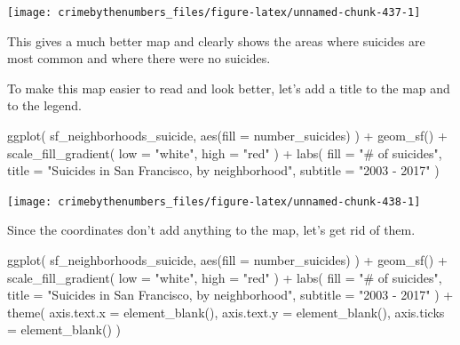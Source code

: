 \documentclass[
]{krantz}
\makeatletter
\newenvironment{Shaded}{\begin{snugshade}}{\end{snugshade}}
\newcommand{\AttributeTok}[1]{\textcolor[rgb]{0.61,0.61,0.61}{#1}}
\newcommand{\FunctionTok}[1]{\textcolor[rgb]{0,0,0}{#1}}
\newcommand{\NormalTok}[1]{#1}
\newcommand{\SpecialCharTok}[1]{\textcolor[rgb]{0,0,0}{#1}}
\newcommand{\StringTok}[1]{\textcolor[rgb]{0.5,0.5,0.5}{#1}}
\newenvironment{kframe}{%
\medskip{}
\setlength{\fboxsep}{.8em}
 \def\at@end@of@kframe{}%
 \ifinner\ifhmode%
  \def\at@end@of@kframe{\end{minipage}}%
  \begin{minipage}{\columnwidth}%
 \fi\fi%
 \def\FrameCommand##1{\hskip\@totalleftmargin \hskip-\fboxsep
 \colorbox{shadecolor}{##1}\hskip-\fboxsep
     \hskip-\linewidth \hskip-\@totalleftmargin \hskip\columnwidth}%
 \MakeFramed {\advance\hsize-\width
   \@totalleftmargin\z@ \linewidth\hsize
   \@setminipage}}%
 {\par\unskip\endMakeFramed%
 \at@end@of@kframe}
\renewenvironment{Shaded}{\begin{kframe}}{\end{kframe}}
\makeatother
\begin{document}
\begin{center}\texttt{[image: crimebythenumbers\_files/figure-latex/unnamed-chunk-437-1]} \end{center}

This gives a much better map and clearly shows the areas
where suicides are most common and where there were no
suicides.

To make this map easier to read and look better, let's add a
title to the map and to the legend.

\begin{Shaded}
\begin{Highlighting}[]
\FunctionTok{ggplot}\NormalTok{(}
\NormalTok{  sf\_neighborhoods\_suicide,}
  \FunctionTok{aes}\NormalTok{(}\AttributeTok{fill =}\NormalTok{ number\_suicides)}
\NormalTok{) }\SpecialCharTok{+}
  \FunctionTok{geom\_sf}\NormalTok{() }\SpecialCharTok{+}
  \FunctionTok{scale\_fill\_gradient}\NormalTok{(}
    \AttributeTok{low =} \StringTok{"white"}\NormalTok{,}
    \AttributeTok{high =} \StringTok{"red"}
\NormalTok{  ) }\SpecialCharTok{+}
  \FunctionTok{labs}\NormalTok{(}
    \AttributeTok{fill =} \StringTok{"\# of suicides"}\NormalTok{,}
    \AttributeTok{title =} \StringTok{"Suicides in San Francisco, by neighborhood"}\NormalTok{,}
    \AttributeTok{subtitle =} \StringTok{"2003 {-} 2017"}
\NormalTok{  )}
\end{Highlighting}
\end{Shaded}

\begin{center}\texttt{[image: crimebythenumbers\_files/figure-latex/unnamed-chunk-438-1]} \end{center}

Since the coordinates don't add anything to the map, let's
get rid of them.

\begin{Shaded}
\begin{Highlighting}[]
\FunctionTok{ggplot}\NormalTok{(}
\NormalTok{  sf\_neighborhoods\_suicide,}
  \FunctionTok{aes}\NormalTok{(}\AttributeTok{fill =}\NormalTok{ number\_suicides)}
\NormalTok{) }\SpecialCharTok{+}
  \FunctionTok{geom\_sf}\NormalTok{() }\SpecialCharTok{+}
  \FunctionTok{scale\_fill\_gradient}\NormalTok{(}
    \AttributeTok{low =} \StringTok{"white"}\NormalTok{,}
    \AttributeTok{high =} \StringTok{"red"}
\NormalTok{  ) }\SpecialCharTok{+}
  \FunctionTok{labs}\NormalTok{(}
    \AttributeTok{fill =} \StringTok{"\# of suicides"}\NormalTok{,}
    \AttributeTok{title =} \StringTok{"Suicides in San Francisco, by neighborhood"}\NormalTok{,}
    \AttributeTok{subtitle =} \StringTok{"2003 {-} 2017"}
\NormalTok{  ) }\SpecialCharTok{+}
  \FunctionTok{theme}\NormalTok{(}
    \AttributeTok{axis.text.x =} \FunctionTok{element\_blank}\NormalTok{(),}
    \AttributeTok{axis.text.y =} \FunctionTok{element\_blank}\NormalTok{(),}
    \AttributeTok{axis.ticks =} \FunctionTok{element\_blank}\NormalTok{()}
\NormalTok{  )}
\end{Highlighting}
\end{Shaded}
\end{document}
